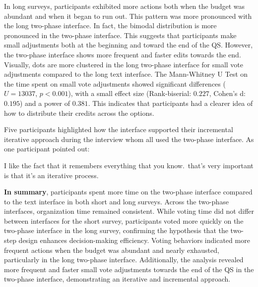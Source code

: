 In long surveys, participants exhibited more actions both when the budget was abundant and when it began to run out. This pattern was more pronounced with the long two-phase interface. In fact, the bimodal distribution is more pronounced in the two-phase interface. This suggests that participants make small adjustments both at the beginning and toward the end of the QS. However, the two-phase interface shows more frequent and faster edits towards the end. Visually, dots are more clustered in the long two-phase interface for small vote adjustments compared to the long text interface. The Mann-Whitney U Test on the time spent on small vote adjustments showed significant differences ($U=13037$, $p<0.001$), with a small effect size (Rank-biserial: $0.227$, Cohen's d: $0.195$) and a power of $0.381$. This indicates that participants had a clearer idea of how to distribute their credits across the options.

Five participants highlighted how the interface supported their incremental iterative approach during the interview whom all used the two-phase interface. As one participant pointed out:

\begin{displayquote}
I like the fact that it remembers everything that you know.~\bracketellipsis that's very important is that it's an iterative process.\hfill{}
\end{displayquote}

\textbf{In summary}, participants spent more time on the two-phase interface compared to the text interface in both short and long surveys. Across the two-phase interfaces, organization time remained consistent. While voting time did not differ between interfaces for the short survey, participants voted more quickly on the two-phase interface in the long survey, confirming the hypothesis that the two-step design enhances decision-making efficiency. Voting behaviors indicated more frequent actions when the budget was abundant and nearly exhausted, particularly in the long two-phase interface. Additionally, the analysis revealed more frequent and faster small vote adjustments towards the end of the QS in the two-phase interface, demonstrating an iterative and incremental approach. 



